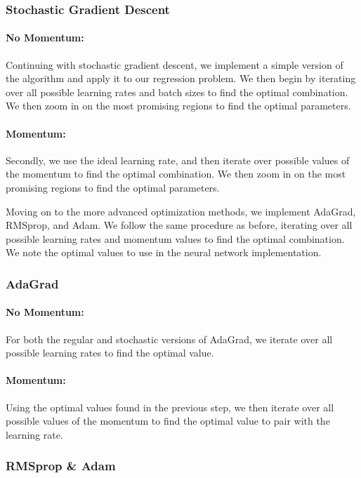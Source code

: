 \subsubsection{Stochastic Gradient Descent}
\paragraph*{No Momentum:}
Continuing with stochastic gradient descent, we implement a simple version of the algorithm and apply it to our regression problem. We then begin by iterating over all possible learning rates and batch sizes to find the optimal combination. We then zoom in on the most promising regions to find the optimal parameters.
\paragraph*{Momentum:}
Secondly, we use the ideal learning rate, and then iterate over possible values of the momentum to find the optimal combination. We then zoom in on the most promising regions to find the optimal parameters.

Moving on to the more advanced optimization methods, we implement AdaGrad, RMSprop, and Adam. We follow the same procedure as before, iterating over all possible learning rates and momentum values to find the optimal combination. We note the optimal values to use in the neural network implementation.

\subsubsection{AdaGrad}
\paragraph{No Momentum:}
For both the regular and stochastic versions of AdaGrad, we iterate over all possible learning rates to find the optimal value.

\paragraph{Momentum:}
Using the optimal values found in the previous step, we then iterate over all possible values of the momentum to find the optimal value to pair with the learning rate.

\subsubsection{RMSprop \& Adam}
